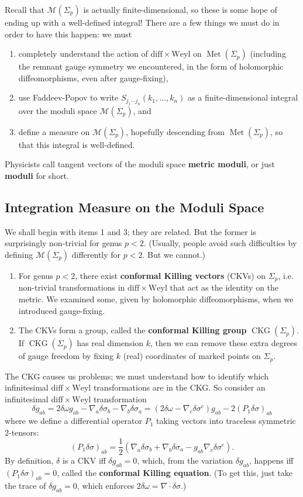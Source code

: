 \documentclass{report}
\theoremstyle{plain}
\theoremstyle{definition}
\theoremstyle{remark}
\newcommand{\cM}{\mathcal{M}}
\newcommand{\diff}{\mathrm{diff}}
\newcommand{\Weyl}{\mathrm{Weyl}}
\DeclareMathOperator{\Met}{Met}
\DeclareMathOperator{\CKG}{CKG}
\begin{document}
Recall that $\cM(\Sigma_p)$ is actually finite-dimensional, so these
is some hope of ending up with a well-defined integral! There are a
few things we must do in order to have this happen: we must
\begin{enumerate}
\item completely understand the action of $\diff \times \Weyl$ on
  $\Met(\Sigma_p)$ (including the remnant gauge symmetry we
  encountered, in the form of holomorphic diffeomorphisms, even after
  gauge-fixing),
\item use Faddeev-Popov to write $S_{j_1\cdots j_n}(k_1, \ldots, k_n)$
  as a finite-dimensional integral over the moduli space
  $\cM(\Sigma_p)$, and
\item define a measure on $\cM(\Sigma_p)$, hopefully descending from
  $\Met(\Sigma_p)$, so that this integral is well-defined.
\end{enumerate}
Physicists call tangent vectors of the moduli space {\bf metric
  moduli}, or just {\bf moduli} for short.

\subsection{Integration Measure on the Moduli Space}

We shall begin with items 1 and 3; they are related. But the former is
surprisingly non-trivial for genus $p < 2$. (Usually, people avoid
such difficulties by defining $\cM(\Sigma_p)$ differently for $p < 2$.
But we cannot.)
\begin{enumerate}
\item For genus $p < 2$, there exist {\bf conformal Killing vectors}
  (CKVs) on $\Sigma_p$, i.e. non-trivial transformations in $\diff
  \times \Weyl$ that act as the identity on the metric. We examined
  some, given by holomorphic diffeomorphisms, when we introduced
  gauge-fixing.
\item The CKVs form a group, called the {\bf conformal Killing group}
  $\CKG(\Sigma_p)$. If $\CKG(\Sigma_p)$ has real dimension $k$, then
  we can remove these extra degrees of gauge freedom by fixing $k$
  (real) coordinates of marked points on $\Sigma_p$.
\end{enumerate}
The CKG causes us problems; we must understand how to identify which
infinitesimal $\diff \times \Weyl$ transformations are in the CKG. So
consider an infinitesimal $\diff \times \Weyl$ transformation
\[ \delta g_{ab} = 2\delta \omega g_{ab} - \nabla_a \delta \sigma_b - \nabla_b \delta \sigma_a = (2\delta \omega - \nabla_c \delta \sigma^c)g_{ab} - 2(P_1\delta \sigma)_{ab} \]
where we define a differential operator $P_1$ taking vectors into
traceless symmetric $2$-tensors:
\[ (P_1 \delta \sigma)_{ab} = \frac{1}{2}(\nabla_a \delta \sigma_b + \nabla_b \delta \sigma_a - g_{ab} \nabla_c \delta \sigma^c). \]
By definition, $\delta$ is a CKV iff $\delta g_{ab} = 0$, which, from
the variation $\delta g_{ab}$, happens iff $(P_1\delta\sigma)_{ab} =
0$, called the {\bf conformal Killing equation}. (To get this, just
take the trace of $\delta g_{ab} = 0$, which enforces $2\delta\omega =
\nabla \cdot \delta \sigma$.)
\end{document}
